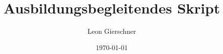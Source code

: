 \title{Ausbildungsbegleitendes Skript}
\author{Leon Gierschner}
\date{\today}
\maketitle

\tableofcontents
\cleartoleftpage